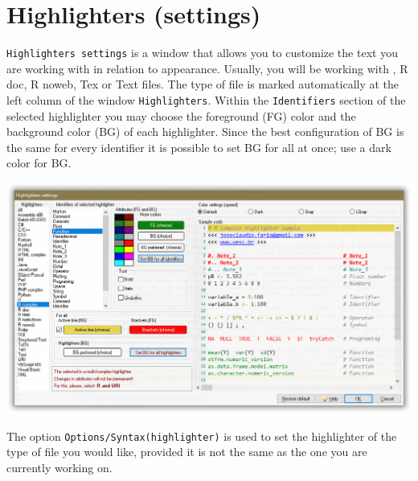 
\section{Highlighters (settings)}

\texttt{Highlighters settings} is a window that allows you to customize the text you are working with in relation to appearance.
Usually, you will be working with \RR{}, R doc, R noweb, Tex or Text files.
The type of file is marked automatically at the left column of the window \texttt{Highlighters}.
Within the \texttt{Identifiers} section of the selected highlighter you may choose the foreground (FG)
color and the background color (BG) of each highlighter. Since the best configuration of BG is the same for every
identifier it is possible to set BG for all at once; use a dark color for BG.

\includegraphics[scale=0.50]{./res/dlg_highlighter_settings.png}

The option \texttt{Options/Syntax(highlighter)} is used to set the highlighter of the type of file you would like,
provided it is not the same as the one you are currently working on.
